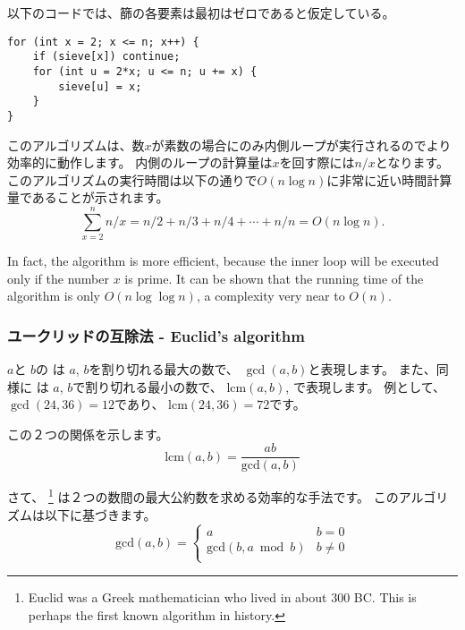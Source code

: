 以下のコードでは、篩の各要素は最初はゼロであると仮定している。

\begin{lstlisting}
for (int x = 2; x <= n; x++) {
    if (sieve[x]) continue;
    for (int u = 2*x; u <= n; u += x) {
        sieve[u] = x;
    }
}
\end{lstlisting}

このアルゴリズムは、数$x$が素数の場合にのみ内側ループが実行されるのでより効率的に動作します。
内側のループの計算量は$x$を回す際には$n/x$となります。
このアルゴリズムの実行時間は以下の通りで$ O(n \log n)$に非常に近い時間計算量であることが示されます。
\[\sum_{x=2}^n n/x = n/2 + n/3 + n/4 + \cdots + n/n = O(n \log n).\]


In fact, the algorithm is more efficient,
because the inner loop will be executed only if
the number $x$ is prime.
It can be shown that the running time of the
algorithm is only $O(n \log \log n)$,
a complexity very near to $O(n)$.

\subsubsection{ユークリッドの互除法 - Euclid's algorithm}



$a$と $b$の
は
$a$, $b$を割り切れる最大の数で、
 $\gcd(a,b)$と表現します。
 また、同様に
 は
$a$, $b$で割り切れる最小の数で、
 $\textrm{lcm}(a,b)$,
で表現します。
例として、
$\gcd(24,36)=12$であり、
$\textrm{lcm}(24,36)=72$です。

この２つの関係を示します。
\[\textrm{lcm}(a,b)=\frac{ab}{\textrm{gcd}(a,b)}\]

さて、
\footnote{Euclid was a Greek mathematician who
lived in about 300 BC. This is perhaps the first known algorithm in history.}
は２つの数間の最大公約数を求める効率的な手法です。
このアルゴリズムは以下に基づきます。
\begin{equation*}
    \textrm{gcd}(a,b) = \begin{cases}
               a        & b = 0\\
               \textrm{gcd}(b,a \bmod b) & b \neq 0\\
           \end{cases}
\end{equation*}

